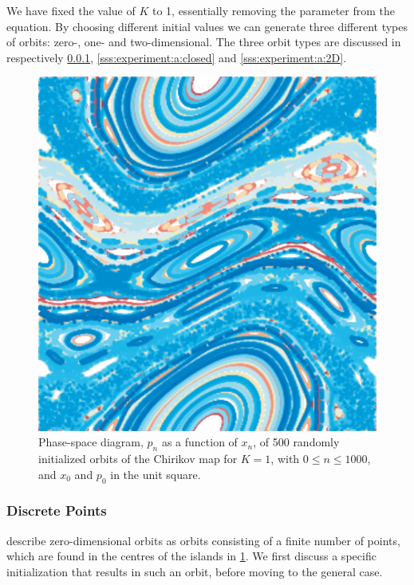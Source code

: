 We have fixed the value of $K$ to 1, essentially removing the parameter from the equation. By choosing different initial values we can generate three different types of orbits: zero-, one- and two-dimensional. The three orbit types are discussed in respectively \cref{sss:experiment:a:discrete}, \ref{sss:experiment:a:closed} and \ref{sss:experiment:a:2D}.

 	\begin{figure}
		\centering
		\includegraphics[width=0.9\columnwidth, height=0.2\textheight, keepaspectratio=true]{./img/assignment_a_pretty_low_res.pdf}
		\caption{Phase-space diagram, $p_n$ as a function of $x_n$, of 500 randomly initialized orbits of the Chirikov map for $K = 1$, with $0 \leq n \leq 1000$, and $x_0$ and $p_0$ in the unit square.}
		\label{fig:a:pretty}
	\end{figure}

\subsubsection{Discrete Points}
\label{sss:experiment:a:discrete}
\textcite{kenzel1997physics} describe zero-dimensional orbits as orbits consisting of a finite number of points, which are found in the centres of the islands in \cref{fig:a:pretty}. We first discuss a specific initialization that results in such an orbit, before moving to the general case.\\

